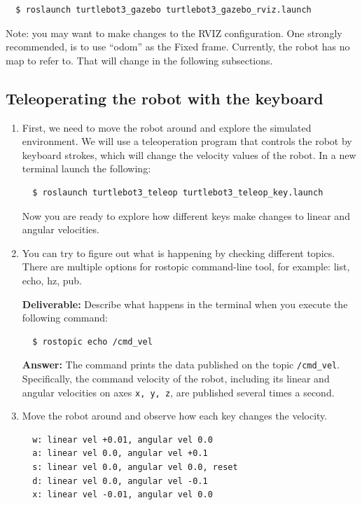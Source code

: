 \documentclass[12pt]{article}
\begin{document}
\begin{verbatim}
  $ roslaunch turtlebot3_gazebo turtlebot3_gazebo_rviz.launch
\end{verbatim}

Note: you may want to make changes to the RVIZ configuration. One strongly recommended, is to use “odom” as the Fixed frame. Currently, the robot has no map to refer to. That will change in the following subsections.

\subsection{Teleoperating the robot with the keyboard}
\begin{enumerate}
    

\item  First, we need to move the robot around and explore the simulated environment. We will use a teleoperation program that controls the robot by keyboard strokes, which will change the velocity values of the robot. In a new terminal launch the following:

\begin{verbatim}
  $ roslaunch turtlebot3_teleop turtlebot3_teleop_key.launch
\end{verbatim}

Now you are ready to explore how different keys make changes to linear and angular velocities.

\item  You can try to figure out what is happening by checking different topics. There are multiple options for rostopic command-line tool, for example:  list, echo, hz, pub. 

\textbf{Deliverable:} Describe what happens in the terminal when you execute the following command:

\begin{verbatim}
  $ rostopic echo /cmd_vel
\end{verbatim}

\textbf{Answer: }The command prints the data published on the topic \texttt{/cmd_vel}.
\\Specifically, the command velocity of the robot, including its linear and angular velocities on axes \texttt{x, y, z}, are published several times a second.

\item Move the robot around and observe how each key changes the velocity.

\begin{verbatim}
  w: linear vel +0.01, angular vel 0.0
  a: linear vel 0.0, angular vel +0.1
  s: linear vel 0.0, angular vel 0.0, reset
  d: linear vel 0.0, angular vel -0.1
  x: linear vel -0.01, angular vel 0.0
\end{verbatim}


\end{enumerate}
\end{document}
